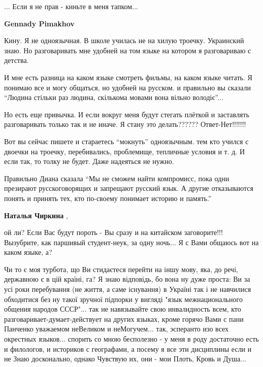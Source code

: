 \begin{itemize}
\begin{itemize}
... Если я не прав - киньте в меня тапком...

 
\textbf{Gennady Pimakhov} 

Кину. Я не одноязычная. В школе училась не на хилую
троечку. Украинский знаю. Но разговаривать мне удобней на том языке на котором я
разговариваю с детства. 

И мне есть разница на каком языке смотреть фильмы, на
каком языке читать. Я понимаю все и могу общаться, но удобней на русском. и
правильно вы сказали \enquote{Людина стільки раз людина, скількома мовами вона вільно
володіє}... 

Но есть еще привычка. И если вокруг меня будут стегать плёткой и
заставлять разговаривать только так и не иначе. Я стану это
делать?????? Ответ-Нет!!!!!!! 

Вот вы сейчас пишете и
стараетесь \enquote{мокнуть} одноязычным. тем кто учился с двоечки на
троечку, перебивались, проблемище, тепличные условия и т. д. И если так, то толку не
будет. Даже надеяться не нужно. 

Правильно Диана сказала \enquote{Мы не сможем найти
компромисс, пока одни презирают русскоговорящих и запрещают русский язык. А
другие отказываются понять и принять тех, кто по-своему понимает историю и
память.}

 
\textbf{Наталья Чиркина} , 

ой ли? Если Вас будут пороть - Вы сразу и на китайском заговорите!!! Вызубрите,
как паршивый студент-неук, за одну ночь... Я с Вами общаюсь вот на каком языке,
а?

Чи то є моя турбота, що Ви стидаєтеся перейти на іншу мову, яка, до речі,
державною є в цій країні, га? Я знаю відповідь, бо вона ну дуже проста: Ви за
усі роки перебування (не життя, а саме існування) в Україні так і не навчилися
обходитися без ну такої зручної підпорки у вигляді "язык межнационального
общения народов СССР"... так не навязывайте свою инвалидность всем, кто
разговаривает-думает-действует на других языках, кроме горячо Вами с пани
Панченко уважаемом неВеликом и неМогучем... так, эсперанто изо всех окрестных
языков... спорить со мною бесполезно - у меня в роду достаточно есть и
филологов, и историков с географами, а посему я все эти дисциплины если и не
Знаю досконально, однако Чувствую их, они - мои Плоть, Кровь и Душа...


\end{itemize}
\end{itemize}
